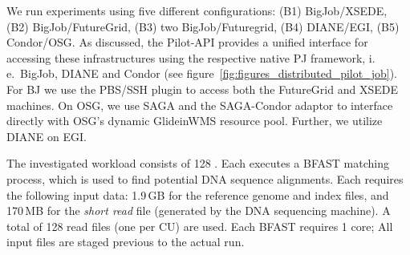\documentclass[conference]{IEEEtran}
\begin{document}


We run experiments using five different configurations: (B1) BigJob/XSEDE,
(B2) BigJob/FutureGrid, (B3) two BigJob/Futuregrid, (B4) DIANE/EGI, (B5)
Condor/OSG. As discussed, the Pilot-API provides a unified interface for
accessing these infrastructures using the respective native PJ framework,
i.\,e.\ BigJob, DIANE and Condor (see
figure~\ref{fig:figures_distributed_pilot_job}). For BJ we use the PBS/SSH
plugin to access both the FutureGrid and XSEDE machines. On OSG, we use SAGA
and the SAGA-Condor adaptor to interface directly with OSG's dynamic
GlideinWMS resource pool. Further, we utilize DIANE on EGI.

The investigated workload consists of 128 \cus. Each \cu executes a BFAST
matching process, which is used to find potential DNA sequence alignments.
Each \cu requires the following input data: 1.9\,GB for the
reference genome and index files, and 170\,MB for the \textit{short read}
file (generated by the DNA sequencing machine). A total
of 128 read files (one per CU) are used. Each BFAST \cu requires 1 core; All
input files are staged previous to the actual run.




\end{document}
